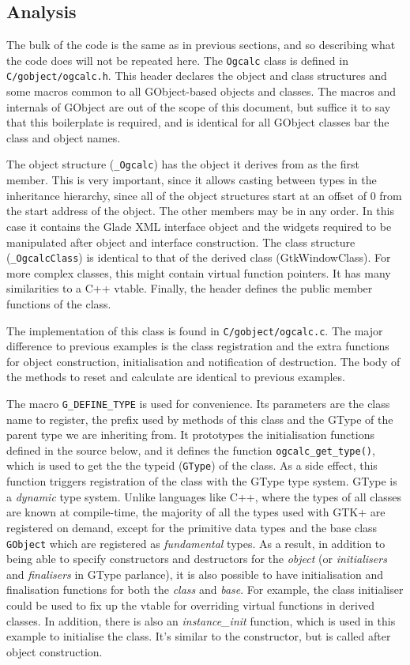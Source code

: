 \documentclass[a4paper,oneside]{article}
\newcommand{\filename}[1]{\texttt{#1}}
\newcommand{\variable}[1]{\textsl{#1}}
\newcommand{\class}[1]{\texttt{#1}}
\newcommand{\function}[1]{\texttt{#1()}}
\newcommand{\type}[1]{\texttt{#1}}
\newcommand{\code}[1]{\texttt{#1}}
\begin{document}
\subsection{Analysis}

The bulk of the code is the same as in previous sections, and so
describing what the code does will not be repeated here.  The
\class{Ogcalc} class is defined in \filename{C/gobject/ogcalc.h}.
This header declares the object and class structures and some macros
common to all GObject-based objects and classes.  The macros and
internals of GObject are out of the scope of this document, but
suffice it to say that this boilerplate is required, and is identical
for all GObject classes bar the class and object names.

The object structure (\class{\_Ogcalc}) has the object it derives from
as the first member.  This is very important, since it allows casting
between types in the inheritance hierarchy, since all of the object
structures start at an offset of 0 from the start address of the
object.  The other members may be in any order.  In this case it
contains the Glade XML interface object and the widgets required to be
manipulated after object and interface construction.  The class
structure (\class{\_OgcalcClass}) is identical to that of the derived
class (GtkWindowClass).  For more complex classes, this might contain
virtual function pointers.  It has many similarities to a C++ vtable.
Finally, the header defines the public member functions of the class.

The implementation of this class is found in
\filename{C/gobject/ogcalc.c}.  The major difference to previous
examples is the class registration and the extra functions for object
construction, initialisation and notification of destruction.  The
body of the methods to reset and calculate are identical to previous
examples.

The macro \code{G\_DEFINE\_TYPE} is used for convenience.  Its
parameters are the class name to register, the prefix used by methods
of this class and the GType of the parent type we are inheriting from.
It prototypes the initialisation functions defined in the source
below, and it defines the function \function{ogcalc\_get\_type}, which
is used to get the the typeid (\type{GType}) of the class.  As a side
effect, this function triggers registration of the class with the
GType type system.  GType is a \emph{dynamic} type system.  Unlike
languages like C++, where the types of all classes are known at
compile-time, the majority of all the types used with GTK+ are
registered on demand, except for the primitive data types and the base
class \class{GObject} which are registered as \emph{fundamental}
types.  As a result, in addition to being able to specify constructors
and destructors for the \emph{object} (or \emph{initialisers} and
\emph{finalisers} in GType parlance), it is also possible to have
initialisation and finalisation functions for both the \emph{class}
and \emph{base}.  For example, the class initialiser could be used to
fix up the vtable for overriding virtual functions in derived classes.
In addition, there is also an \variable{instance\_init} function, which
is used in this example to initialise the class.  It's similar to the
constructor, but is called after object construction.
\end{document}
